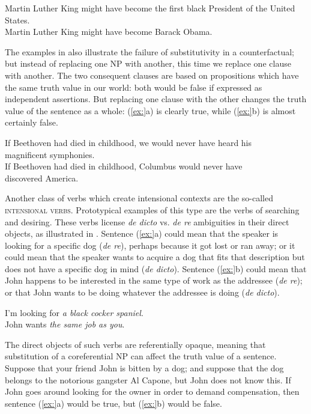 \ea
\ea Martin Luther King might have become the first black President of the United States.\\
\ex Martin Luther King might have become Barack Obama.
                       \z
\z


The examples in  also illustrate the failure of substitutivity in a counterfactual; but instead of replacing one NP with another, this time we replace one clause with another. The two consequent clauses are based on propositions which have the same truth value in our world: both would be false if expressed as independent assertions. But replacing one clause with the other changes the truth value of the sentence as a whole: (\ref{ex:}a) is clearly true, while (\ref{ex:}b) is almost certainly false.


\ea
\ea If Beethoven had died in childhood, we would never have heard his\\
  magnificent symphonies.\\
\ex If Beethoven had died in childhood, Columbus would never have\\
  discovered America.
                       \z
\z


Another class of verbs which create intensional contexts are the so-called \textsc{intensional verbs}. Prototypical examples of this type are the verbs of searching and desiring. These verbs license \textit{de dicto} vs. \textit{de re} ambiguities in their direct objects, as illustrated in . Sentence (\ref{ex:}a) could mean that the speaker is looking for a specific dog (\textit{de re}), perhaps because it got lost or ran away; or it could mean that the speaker wants to acquire a dog that fits that description but does not have a specific dog in mind (\textit{de dicto}). Sentence (\ref{ex:}b) could mean that John happens to be interested in the same type of work as the addressee (\textit{de re}); or that John wants to be doing whatever the addressee is doing (\textit{de dicto}).


\ea
\ea I’m looking for \textit{a black cocker spaniel}.\\
\ex John wants \textit{the same job as you}.
                       \z
\z


The direct objects of such verbs are referentially opaque, meaning that substitution of a coreferential NP can affect the truth value of a sentence. Suppose that your friend John is bitten by a dog; and suppose that the dog belongs to the notorious gangster Al Capone, but John does not know this. If John goes around looking for the owner in order to demand compensation, then sentence (\ref{ex:}a) would be true, but (\ref{ex:}b) would be false.


